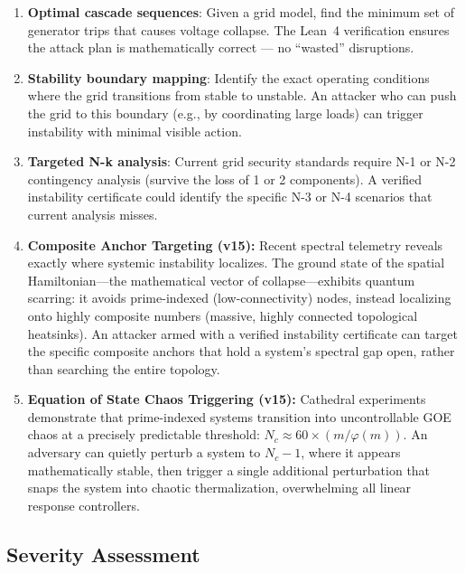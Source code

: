\documentclass[11pt,a4paper]{article}
\begin{document}
\begin{enumerate}
  \item \textbf{Optimal cascade sequences}: Given a grid model,
    find the minimum set of generator trips that causes voltage
    collapse. The Lean~4 verification ensures the attack plan is
    mathematically correct --- no ``wasted'' disruptions.

  \item \textbf{Stability boundary mapping}: Identify the exact
    operating conditions where the grid transitions from stable to
    unstable. An attacker who can push the grid to this boundary
    (e.g., by coordinating large loads) can trigger instability with
    minimal visible action.

  \item \textbf{Targeted N-k analysis}: Current grid security
    standards require N-1 or N-2 contingency analysis (survive the
    loss of 1 or 2 components). A verified instability certificate
    could identify the specific N-3 or N-4 scenarios that current
    analysis misses.
  \item \textbf{Composite Anchor Targeting (v15):} Recent spectral
    telemetry reveals exactly where systemic instability localizes.
    The ground state of the spatial Hamiltonian---the mathematical
    vector of collapse---exhibits quantum scarring: it avoids
    prime-indexed (low-connectivity) nodes, instead localizing
    onto highly composite numbers (massive, highly connected
    topological heatsinks). An attacker armed with a verified
    instability certificate can target the specific composite
    anchors that hold a system's spectral gap open, rather than
    searching the entire topology.

  \item \textbf{Equation of State Chaos Triggering (v15):}
    Cathedral experiments demonstrate that prime-indexed systems
    transition into uncontrollable GOE chaos at a precisely
    predictable threshold: $N_c \approx 60 \times (m/\varphi(m))$.
    An adversary can quietly perturb a system to $N_c - 1$, where
    it appears mathematically stable, then trigger a single
    additional perturbation that snaps the system into chaotic
    thermalization, overwhelming all linear response controllers.
\end{enumerate}

\subsection{Severity Assessment}
\end{document}
